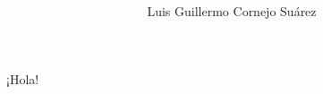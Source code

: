\documentclass{beamer} %
\author{Luis Guillermo Cornejo Suárez}
\title{
{\ty}
{\normalfont}
}
\begin{document}
\begin{frame}

\Huge ¡Hola!

\end{frame}
\end{document}
